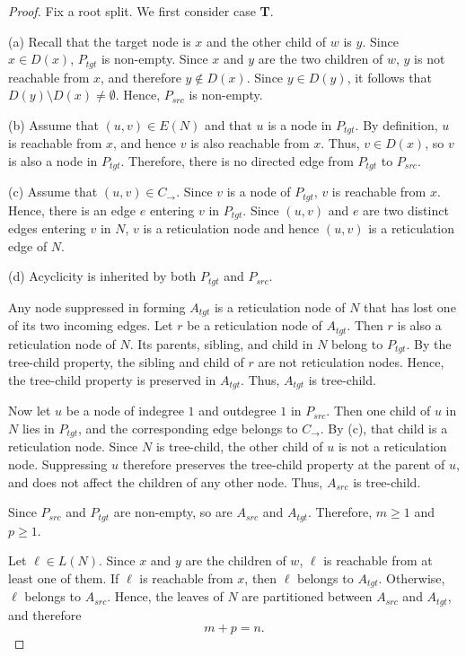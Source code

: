 \documentclass[11pt]{article}
\theoremstyle{definition}
\theoremstyle{remark}
\begin{document}
\begin{proof}
Fix a root split. We first consider case \textbf{T}.

(a) Recall that the target node is $x$ and the other child of $w$ is $y$.
Since $x\in D(x)$, $P_{tgt}$ is non-empty. Since $x$ and $y$ are the two
children of $w$, $y$ is not reachable from $x$, and therefore
$y\notin D(x)$. Since $y\in D(y)$, it follows that
$D(y)\setminus D(x)\neq\emptyset$. Hence, $P_{src}$ is non-empty.

(b) Assume that $(u,v)\in E(N)$ and that $u$ is a node in $P_{tgt}$.
By definition, $u$ is reachable from $x$, and hence $v$ is also
reachable from $x$. Thus, $v\in D(x)$, so $v$ is also a node in $P_{tgt}$.
Therefore, there is no directed edge from $P_{tgt}$ to $P_{src}$.

(c) Assume that $(u,v)\in C_{\rightarrow}$. Since $v$ is a node
of $P_{tgt}$, $v$ is reachable from $x$. Hence, there is an edge $e$
entering $v$ in $P_{tgt}$. Since $(u,v)$ and $e$ are two distinct edges
entering $v$ in $N$, $v$ is a reticulation node and hence $(u,v)$ is a reticulation edge of $N$.

(d) Acyclicity is inherited by both $P_{tgt}$ and $P_{src}$.

Any node suppressed in forming $A_{tgt}$ is a reticulation node of $N$
that has lost one of its two incoming edges. Let $r$ be a reticulation
node of $A_{tgt}$. Then $r$ is also a reticulation node of $N$. Its parents,
sibling, and child in $N$ belong to $P_{tgt}$. By the tree-child property,
the sibling and child of $r$ are not reticulation nodes. Hence, the
tree-child property is preserved in $A_{tgt}$. Thus, $A_{tgt}$ is tree-child.

Now let $u$ be a node of indegree $1$ and outdegree $1$ in $P_{src}$.
Then one child of $u$ in $N$ lies in $P_{tgt}$, and the corresponding edge
belongs to $C_{\rightarrow}$. By (c), that child is a reticulation
node. Since $N$ is tree-child, the other child of $u$ is not a
reticulation node. Suppressing $u$ therefore preserves the tree-child
property at the parent of $u$, and does not affect the children of any
other node. Thus, $A_{src}$ is tree-child.

Since $P_{src}$ and $P_{tgt}$ are non-empty, so are $A_{src}$ and $A_{tgt}$.
Therefore, $m\geq1$ and $p\geq1$.

Let $\ell\in L(N)$. Since $x$ and $y$ are the children of $w$,
$\ell$ is reachable from at least one of them. If $\ell$ is reachable
from $x$, then $\ell$ belongs to $A_{tgt}$. Otherwise, $\ell$ belongs to
$A_{src}$. Hence, the leaves of $N$ are partitioned between $A_{src}$ and
$A_{tgt}$, and therefore
\[
m+p=n.
\]


\end{proof}
\end{document}
